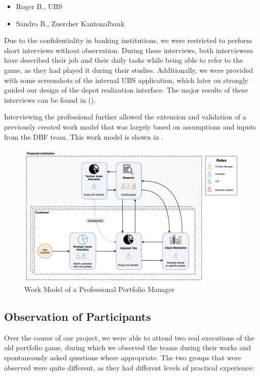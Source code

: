 \begin{itemize}
  \item Roger B., UBS
  \item Sandro B., Zuercher Kantonalbank
\end{itemize}

Due to the confidentiality in banking institutions, we were restricted to perform short interviews without observation. During these interviews, both interviewees have described their job and their daily tasks while being able to refer to the game, as they had played it during their studies. Additionally, we were provided with some screenshots of the internal UBS application, which later on strongly guided our design of the depot realization interface. The major results of these interviews can be found in ().

Interviewing the professional further allowed the extension and validation of a previously created work model that was largely based on assumptions and inputs from the DBF team. This work model is shown in .

\begin{figure}[h!]
  \centering
  \includegraphics[scale=0.35]{img/work_model_process.png}
  \caption{Work Model of a Professional Portfolio Manager}
  \label{fig:work_model_professional}
\end{figure}


\subsection{Observation of Participants}
Over the course of our project, we were able to attend two real executions of the old portfolio game, during which we observed the teams during their works and spontaneously asked questions where appropriate. The two groups that were observed were quite different, as they had different levels of practical experience:

